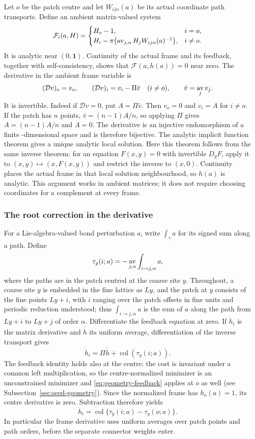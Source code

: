 Let $o$ be the patch centre and let $W_{ij\alpha}(a)$ be its actual
coordinate path transports. Define an ambient matrix-valued system
\[
 \mathcal F_i(a,H)=
 \begin{cases}
 H_o-1,&i=o,\\
 H_i-\pi\bigl(\mathop{\rm av}_{j,\alpha}
                     H_jW_{ij\alpha}(a)^{-1}\bigr),&i\ne o.
 \end{cases}
\]
It is analytic near $(0,\mathbf1)$. Continuity of the actual frame
and its feedback, together with self-consistency, shows that
$\mathcal F(a,h(a))=0$ near zero. The derivative in the ambient
frame variable is
\[
 (\mathcal D v)_o=v_o,\qquad
 (\mathcal D v)_i=v_i-\Pi\bar v\quad(i\ne o),
 \qquad \bar v=\mathop{\rm av}_jv_j.
\]
It is invertible. Indeed if $\mathcal Dv=0$, put $A=\Pi\bar v$.
Then $v_o=0$ and $v_i=A$ for $i\ne o$. If the patch has $n$ points,
$\bar v=(n-1)A/n$, so applying $\Pi$ gives $A=(n-1)A/n$ and
$A=0$. The derivative is an injective endomorphism of a finite
-dimensional space and is therefore bijective. The analytic implicit
function theorem gives a unique analytic local solution. Here this theorem
follows from the same inverse theorem: for an equation $F(x,y)=0$ with
invertible $D_yF$, apply it to $(x,y)\mapsto(x,F(x,y))$ and restrict the
inverse to $(x,0)$. Continuity
places the actual frame in that local solution neighbourhood, so
$h(a)$ is analytic. This argument works in ambient matrices; it does
not require choosing coordinates for a complement at every frame.

\subsubsection{The root correction in the derivative}
For a Lie-algebra-valued bond perturbation $a$, write
$\int_\gamma a$ for its signed sum along a path. Define
\[
 \tau_y(i;a)=-\mathop{\rm av}_{j,\alpha}
                 \int_{i\to j,\alpha}a,
\]
where the paths are in the patch centred at the coarse site $y$.
Throughout, a coarse site $y$ is embedded in the fine lattice as $Ly$,
and the patch at $y$ consists of the fine points $Ly+i$, with $i$
ranging over the patch offsets in fine units and periodic reduction
understood; thus $\int_{i\to j,\alpha}a$ is the sum of $a$ along the
path from $Ly+i$ to $Ly+j$ of order $\alpha$.
Differentiate the feedback equation at zero. If
$\dot h_i$ is the matrix derivative and $\overline{\dot h}$ its
uniform average, differentiation of the inverse transport gives
\[
 \dot h_i=\Pi\overline{\dot h}+\operatorname{col}(\tau_y(i;a)).
\]
The feedback identity holds also at the centre: the cost is
invariant under a common left multiplication, so the
centre-normalized minimizer is an unconstrained minimizer and
\eqref{eq:geometry-feedback} applies at $o$ as well (see
Subsection~\ref{sec:seed-geometry}). Since the normalized
frame has $h_o(a)=1$, its centre derivative is zero. Subtraction
therefore yields
\begin{equation}\label{eq:branch-frame-derivative}
 \dot h_i=\operatorname{col}\{\tau_y(i;a)-\tau_y(o;a)\}.
\end{equation}
In particular the frame derivative uses uniform averages over patch
points and path orders, before the separate connector weights enter.

